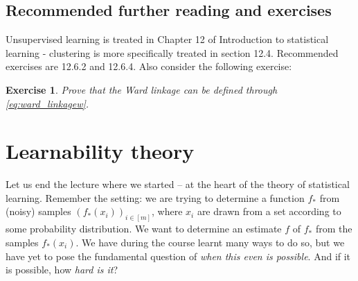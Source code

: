 \documentclass{article}
\newtheorem{exercise}{Exercise}
\begin{document}
\subsection{Recommended further reading and exercises}
Unsupervised learning is treated in Chapter 12 of Introduction to statistical learning - clustering is more specifically treated in section 12.4. Recommended exercises are 12.6.2 and 12.6.4. Also consider the following exercise:

\begin{exercise}
    Prove that the Ward linkage can be defined through \eqref{eq:ward_linkagew}.
\end{exercise}







   

\section{Learnability theory}
Let us end the lecture where we started -- at the heart of the theory of statistical learning. Remember the setting: we are trying to determine a function $f_*$ from (noisy) samples $(f_*(x_i))_{i \in [m]}$, where $x_i$ are drawn from a set according to some probability distribution. We want to determine an estimate $f$ of $f_*$ from the samples $f_*(x_i)$. We have during the course learnt many ways to do so, but we have yet to pose the fundamental question of \emph{when this even is possible}. And if it is possible, how \emph{hard is it}? 
\end{document}
